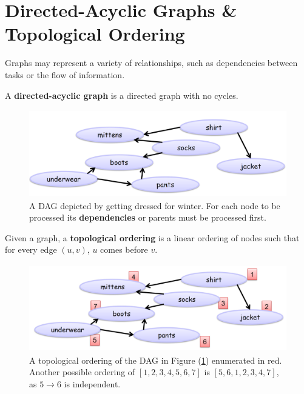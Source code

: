 \section{Directed-Acyclic Graphs \& Topological Ordering}
Graphs may represent a variety of relationships, such as dependencies between tasks or the flow of information. 

\begin{Def}
    
    A \textbf{directed-acyclic graph} is a directed graph with no cycles.
\end{Def}

\begin{figure}[h]
    \begin{center}
      \includegraphics[height=1.5in]{./Sections/graphs/dag/dag.png}
    \end{center}
     \caption{A DAG depicted by getting dressed for winter. For each node to be processed its \textbf{dependencies} or parents must be processed first.}\label{fig:dag}
\end{figure}

\noindent


\begin{Def}

    Given a graph, a \textbf{topological ordering} is a linear ordering of nodes such that for every edge $(u,v)$, $u$ comes before $v$.
\end{Def}

\begin{figure}[h]
    \begin{center}
      \includegraphics[height=1.5in]{./Sections/graphs/dag/top.png}
    \end{center}
     \caption{A topological ordering of the DAG in Figure (\ref{fig:dag}) enumerated in red.
     Another possible ordering of $[1,2,3,4,5,6,7]$ is $[5, 6,1,2,3,4,7]$, as $5\rightarrow 6$ is independent.}\label{fig:top}
\end{figure}
\noindent

